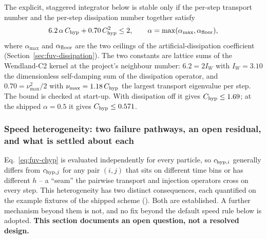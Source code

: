 The explicit, staggered integrator below is stable only if the
per-step transport number and the per-step dissipation number together
satisfy
\begin{equation}
  6.2\,\alpha\,C_{\rm hyp} + 0.70\,C_{\rm hyp}^2 \le 2 , \qquad
  \alpha = \max(\alpha_{\max}, \alpha_{\rm floor}) ,
  \label{eq:fuv-stability-bound}
\end{equation}
where $\alpha_{\max}$ and $\alpha_{\rm floor}$ are the two ceilings of
the artificial-dissipation coefficient
(Section~\ref{sec:fuv-dissipation}). The two constants are lattice sums
of the Wendland-C2 kernel \citep{Wendland1995,DehnenAly2012} at the
project's neighbour number: $6.2 = 2
I_W$ with $I_W = 3.10$ the dimensionless self-damping sum of the
dissipation operator, and $0.70 = \nu_{\max}^2/2$ with $\nu_{\max} =
1.18\,C_{\rm hyp}$ the largest transport eigenvalue per step. The bound
is checked at start-up. With dissipation off it gives $C_{\rm hyp}\le
1.69$; at the shipped $\alpha = 0.5$ it gives $C_{\rm hyp}\le 0.571$.

\subsubsection{Speed heterogeneity: two failure pathways, an open
residual, and what is settled about each}
\label{sec:fuv-chyp-heterogeneity}

Eq.~\ref{eq:fuv-chyp} is evaluated independently for every particle, so
$c_{{\rm hyp},i}$ generally differs from $c_{{\rm hyp},j}$ for any pair
$(i,j)$ that sits on different time bins or has different $h$ -- a
``seam'' the pairwise transport and injection operators cross on every
step. This heterogeneity has two distinct consequences, each
quantified on the example fixtures of the shipped scheme
(). Both are
established. A further mechanism beyond them is not, and no fix beyond the
default speed rule below is adopted. \textbf{This section documents an
open question, not a resolved design.}

